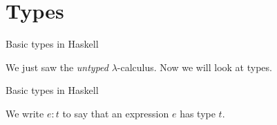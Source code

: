 
\section{Types}

%
\begin{frame}{Basic types in Haskell}

We just saw the \emph{untyped} $\lambda$-calculus. Now we will look at types.

\end{frame}

%
\begin{frame}{Basic types in Haskell}

We write $e:t$ to say that an expression $e$ has type $t$.

\end{frame}

